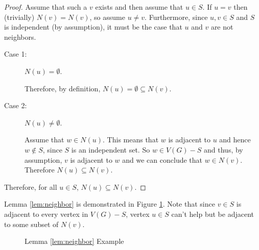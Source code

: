 \begin{proof}
  Assume that such a \(v\) exists and then assume that \(u\in S\).  If \(u=v\) then (trivially) \(N(v)=N(v)\), so
  assume \(u\ne v\).  Furthermore, since \(u,v\in S\) and \(S\) is independent (by assumption), it must be the case
  that \(u\) and \(v\) are not neighbors.

  \begin{description}
  \item[Case 1:] \(N(u)=\emptyset\).
      
    Therefore, by definition, \(N(u)=\emptyset\subseteq N(v)\).

  \item[Case 2:] \(N(u)\ne\emptyset\).

    Assume that \(w\in N(u)\).  This means that \(w\) is adjacent to \(u\) and hence \(w\notin S\), since \(S\) is
    an independent set.  So \(w\in V(G)-S\) and thus, by assumption, \(v\) is adjacent to \(w\) and we can conclude
    that \(w\in N(v)\).  Therefore \(N(u)\subseteq N(v)\).
  \end{description}

  Therefore, for all \(u\in S\), \(N(u)\subseteq N(v)\).
\end{proof}

Lemma \ref{lem:neighbor} is demonstrated in Figure \ref{fig:neighbor}.  Note that since \(v\in S\) is adjacent to
every vertex in \(V(G)-S\), vertex \(u\in S\) can't help but be adjacent to some subset of \(N(v)\).

\begin{figure}[h]
  \label{fig:neighbor}
  \begin{center}
  \end{center}
  \caption{Lemma \ref{lem:neighbor} Example}
\end{figure}

